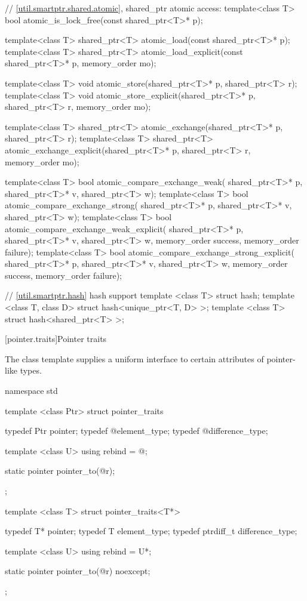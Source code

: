 \begin{codeblock}
{  // \ref{util.smartptr.shared.atomic}, shared_ptr atomic access:
  template<class T>
    bool atomic_is_lock_free(const shared_ptr<T>* p);

  template<class T>
    shared_ptr<T> atomic_load(const shared_ptr<T>* p);
  template<class T>
    shared_ptr<T> atomic_load_explicit(const shared_ptr<T>* p, memory_order mo);

  template<class T>
    void atomic_store(shared_ptr<T>* p, shared_ptr<T> r);
  template<class T>
    void atomic_store_explicit(shared_ptr<T>* p, shared_ptr<T> r, memory_order mo);

  template<class T>
    shared_ptr<T> atomic_exchange(shared_ptr<T>* p, shared_ptr<T> r);
  template<class T>
    shared_ptr<T> atomic_exchange_explicit(shared_ptr<T>* p, shared_ptr<T> r,
                                           memory_order mo);

  template<class T>
    bool atomic_compare_exchange_weak(
      shared_ptr<T>* p, shared_ptr<T>* v, shared_ptr<T> w);
  template<class T>
    bool atomic_compare_exchange_strong(
      shared_ptr<T>* p, shared_ptr<T>* v, shared_ptr<T> w);
  template<class T>
    bool atomic_compare_exchange_weak_explicit(
      shared_ptr<T>* p, shared_ptr<T>* v, shared_ptr<T> w,
      memory_order success, memory_order failure);
  template<class T>
    bool atomic_compare_exchange_strong_explicit(
      shared_ptr<T>* p, shared_ptr<T>* v, shared_ptr<T> w,
      memory_order success, memory_order failure);

  // \ref{util.smartptr.hash} hash support
  template <class T> struct hash;
  template <class T, class D> struct hash<unique_ptr<T, D> >;
  template <class T> struct hash<shared_ptr<T> >;
}
\end{codeblock}

[pointer.traits]{Pointer traits}

\pnum
The class template  supplies a uniform interface to certain
attributes of pointer-like types.

%
\begin{codeblock}
namespace std {
  template <class Ptr> struct pointer_traits {
    typedef Ptr       pointer;
    typedef @\seebelow@ element_type;
    typedef @\seebelow@ difference_type;

    template <class U> using rebind = @\seebelow@;

    static pointer pointer_to(@\seebelow@ r);
  };

  template <class T> struct pointer_traits<T*> {
    typedef T*        pointer;
    typedef T         element_type;
    typedef ptrdiff_t difference_type;

    template <class U> using rebind = U*;

    static pointer pointer_to(@\seebelow@ r) noexcept;
  };
}
\end{codeblock}

